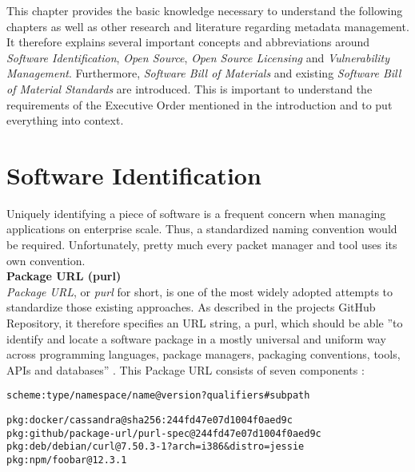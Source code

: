 
 \label{Foundations}
This chapter provides the basic knowledge necessary to understand the following chapters as well as other research and literature regarding metadata management. It therefore explains several important concepts and abbreviations around \textit{Software Identification}, \textit{Open Source}, \textit{Open Source Licensing} and \textit{Vulnerability Management}. Furthermore, \textit{Software Bill of Materials} and existing \textit{Software Bill of Material Standards} are introduced. This is important to understand the requirements of the Executive Order mentioned in the introduction and to put everything into context.

\section{Software Identification} \label{sec:Software Identification}
Uniquely identifying a piece of software is a frequent concern when managing applications on enterprise scale. Thus, a standardized naming convention would be required. Unfortunately, pretty much every packet manager and tool uses its own convention.\\

\noindent
\textbf{Package URL (purl)}\\
\noindent
\textit{Package URL}, or \emph{purl} for short, is one of the most widely adopted attempts to standardize those existing approaches. As described in the projects GitHub Repository, it therefore specifies an URL string, a purl, which should be able ''to identify and locate a software package in a mostly universal and uniform way across programming languages, package managers, packaging conventions, tools, APIs and databases'' \cite{purl}. This Package URL consists of seven components \cite{purl}:\\

\begin{lstlisting}[caption=Package URL, captionpos=b, label=lst:Purl]
scheme:type/namespace/name@version?qualifiers#subpath
\end{lstlisting}

\begin{lstlisting}[caption=Package URL Examples, captionpos=b, label=lst:Purl]
pkg:docker/cassandra@sha256:244fd47e07d1004f0aed9c
pkg:github/package-url/purl-spec@244fd47e07d1004f0aed9c
pkg:deb/debian/curl@7.50.3-1?arch=i386&distro=jessie
pkg:npm/foobar@12.3.1
\end{lstlisting}

